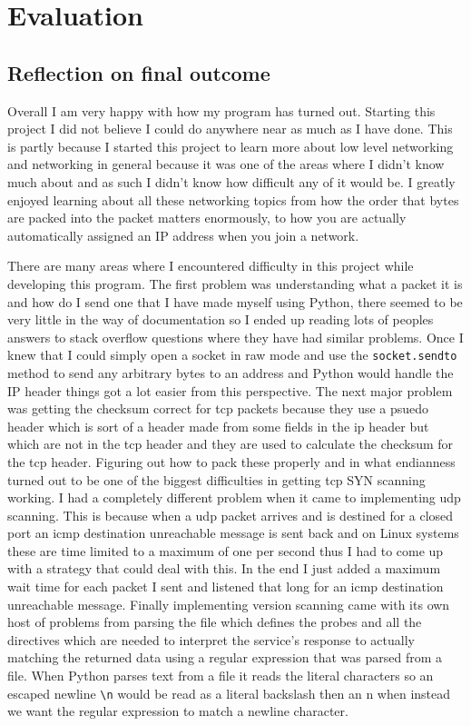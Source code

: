 \documentclass[titlepage]{article}
\let\Oldsection\section{}
\renewcommand{\section}{\FloatBarrier\Oldsection}
\let\Oldsubsection\subsection{}
\renewcommand{\subsection}{\FloatBarrier\Oldsubsection}
\begin{document}
\section{Evaluation}

\subsection{Reflection on final outcome}

Overall I am very happy with how my program has turned out. Starting this
project I did not believe I could do anywhere near as much as I have done.
This is partly because I started this project to learn more about low level networking
and networking in general because it was one of the areas where I didn't know much
about and as such I didn't know how difficult any of it would be.
I greatly enjoyed learning about all these networking topics
from how the order that bytes are packed into the packet matters
enormously, to how you are actually automatically assigned an IP address
when you join a network.

There are many areas where I encountered difficulty in this project while developing this program.
The first problem was understanding what a packet it is and how do I send one that I have made myself
using Python, there seemed to be very little in the way of documentation so I ended up reading
lots of peoples answers to stack overflow questions where they have had similar problems.
Once I knew that I could simply open a socket in raw mode and use the \verb|socket.sendto|
method to send any arbitrary bytes to an address and Python would handle the IP header
things got a lot easier from this perspective. The next major problem was getting the
checksum correct for \gls{tcp} packets because they use a psuedo header which
is sort of a header made from some fields in the \gls{ip} header but which are not
in the \gls{tcp} header and they are used to calculate the checksum for the \gls{tcp}
header. Figuring out how to pack these properly and in what endianness turned out to be
one of the biggest difficulties in getting \gls{tcp} SYN scanning working.
I had a completely different problem when it came to implementing \gls{udp}
scanning. This is because when a \gls{udp} packet arrives and is destined for a closed port
an \gls{icmp} destination unreachable message is sent back and on Linux systems these are time
limited to a maximum of one per second thus I had to come up with a strategy that could deal with
this. In the end I just added a maximum wait time for each packet I sent and listened that long for
an \gls{icmp} destination unreachable message. Finally implementing version scanning came
with its own host of problems from parsing the file which defines the probes and all the
directives which are needed to interpret the service's response to actually matching the returned
data using a regular expression that was parsed from a file.
When Python parses text from a file it reads the literal characters so
an escaped newline \verb|\n| would be read as a literal backslash then an n when instead
we want the regular expression to match a newline character.
\end{document}
